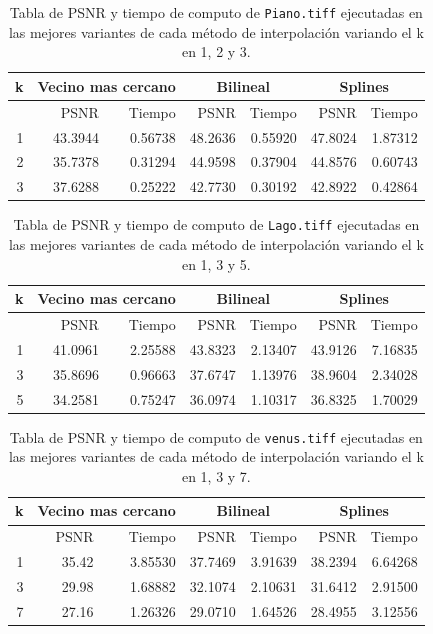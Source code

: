 \documentclass[a4paper]{article}
\newcounter{col}
\begin{document}
\begin{table}[H]
\centering
\begin{tabular}{|r|r|r|r|r|r|r|}
\hline
\multicolumn{1}{|c|}{k} & \multicolumn{2}{|c|}{Vecino mas cercano} & \multicolumn{2}{|c|}{Bilineal} & \multicolumn{2}{|c|}{Splines} \\ \hline
  & PSNR & Tiempo & PSNR & Tiempo & PSNR & Tiempo \\ \hline
1 & 43.3944& 0.56738 & 48.2636 &  0.55920 &  47.8024 & 1.87312 \\ \hline
2 & 35.7378 & 0.31294 & 44.9598 & 0.37904 &  44.8576 & 0.60743 \\ \hline
3 & 37.6288& 0.25222 & 42.7730 & 0.30192 &  42.8922 & 0.42864 \\ \hline
\end{tabular}
\caption{Tabla de PSNR y tiempo de computo de \texttt{Piano.tiff} ejecutadas en las mejores variantes de cada m\'etodo de interpolaci\'on variando el k en 1, 2 y 3.}
\label{}
\end{table}


\begin{table}[H]
\centering
\begin{tabular}{|r|r|r|r|r|r|r|}
\hline
\multicolumn{1}{|c|}{k} & \multicolumn{2}{|c|}{Vecino mas cercano} & \multicolumn{2}{|c|}{Bilineal} & \multicolumn{2}{|c|}{Splines} \\ \hline
  & PSNR & Tiempo & PSNR & Tiempo & PSNR & Tiempo \\ \hline
1 & 41.0961 & 2.25588 & 43.8323 & 2.13407 &  43.9126 & 7.16835 \\ \hline
3 & 35.8696 & 0.96663 & 37.6747 & 1.13976 &  38.9604 & 2.34028 \\ \hline
5 & 34.2581& 0.75247 & 36.0974 & 1.10317 &  36.8325 & 1.70029 \\ \hline
\end{tabular}
\caption{Tabla de PSNR y tiempo de computo de \texttt{Lago.tiff} ejecutadas en las mejores variantes de cada m\'etodo de interpolaci\'on variando el k en 1, 3 y 5.}
\label{}
\end{table}


\begin{table}[H]
\centering
\begin{tabular}{|r|r|r|r|r|r|r|}
\hline
\multicolumn{1}{|c|}{k} & \multicolumn{2}{|c|}{Vecino mas cercano} & \multicolumn{2}{|c|}{Bilineal} & \multicolumn{2}{|c|}{Splines} \\ \hline
  & PSNR & Tiempo & PSNR & Tiempo & PSNR & Tiempo \\ \hline
1 & 35.42 & 3.85530 & 37.7469 & 3.91639 &  38.2394 & 6.64268 \\ \hline
3 & 29.98 & 1.68882 & 32.1074 & 2.10631 &  31.6412 & 2.91500 \\ \hline
7 & 27.16 & 1.26326 &  29.0710 & 1.64526 & 28.4955 & 3.12556 \\ \hline
\end{tabular}
\caption{Tabla de PSNR y tiempo de computo de \texttt{venus.tiff} ejecutadas en las mejores variantes de cada m\'etodo de interpolaci\'on variando el k en 1, 3 y 7.}
\label{}
\end{table}
\end{document}
